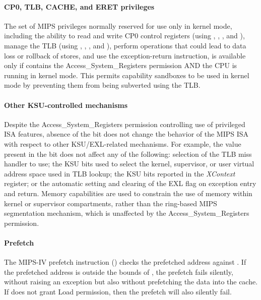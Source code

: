 \paragraph{CP0, TLB, CACHE, and ERET privileges}
The set of MIPS privileges normally reserved for use only in kernel mode,
including the ability to read and write CP0 control registers (using
, , , and
), manage the TLB (using ,
, , and ), perform
 operations that could lead to data loss or rollback of
stores, and use the  exception-return instruction, is
available only if \PCC{} contains the Access\_System\_Registers permission AND
the CPU is running in kernel mode.  This permits capability sandboxes to be used
in kernel mode by preventing them from being subverted using the TLB.

\paragraph{Other KSU-controlled mechanisms}
Despite the Access\_System\_Registers permission controlling use of privileged
ISA features, absence of the bit does not change the behavior of the MIPS ISA
with respect to other KSU/EXL-related mechanisms.
For example, the value present in the bit does not affect any of the
following: selection of the
TLB miss handler to use; the KSU bits used to select the kernel, supervisor,
or user virtual address space used in TLB lookup; the KSU bits reported in the
\textit{XContext} register; or the automatic setting and clearing of the EXL
flag on exception entry and return.
Memory capabilities are used to constrain the use of memory within kernel or
supervisor compartments, rather than the ring-based MIPS segmentation
mechanism, which is unaffected by the Access\_System\_Registers permission.

\paragraph{Prefetch}
\label{sec:mips-prefetch}

The MIPS-IV prefetch instruction () checks the prefetched
address against \DDC. If the prefetched address is outside the bounds of
\DDC{}, the prefetch fails silently, without raising an exception but also
without prefetching the data into the cache. If \DDC{} does not grant
Load permission, then the prefetch will also silently fail.

